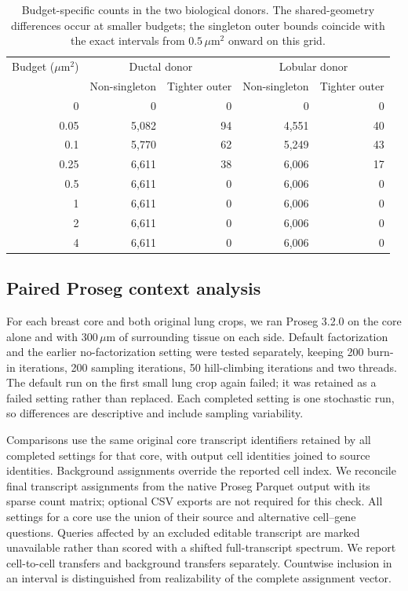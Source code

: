 \begin{table}[ht]\centering
\begin{tabular}{rrrrr}\toprule
Budget ($\mu\mathrm m^2$)&\multicolumn{2}{c}{Ductal donor}&\multicolumn{2}{c}{Lobular donor}\\
&Non-singleton&Tighter outer&Non-singleton&Tighter outer\\\midrule
0&0&0&0&0\\
0.05&5,082&94&4,551&40\\
0.1&5,770&62&5,249&43\\
0.25&6,611&38&6,006&17\\
0.5&6,611&0&6,006&0\\
1&6,611&0&6,006&0\\
2&6,611&0&6,006&0\\
4&6,611&0&6,006&0\\\bottomrule
\end{tabular}
\caption{Budget-specific counts in the two biological donors. The shared-geometry differences occur at smaller budgets; the singleton outer bounds coincide with the exact intervals from $0.5\,\mu\mathrm m^2$ onward on this grid.}
\end{table}

\FloatBarrier
\subsection{Paired Proseg context analysis}
For each breast core and both original lung crops, we ran Proseg 3.2.0 on the core alone and with $300\,\mu\mathrm m$ of surrounding tissue on each side. Default factorization and the earlier no-factorization setting were tested separately, keeping 200 burn-in iterations, 200 sampling iterations, 50 hill-climbing iterations and two threads. The default run on the first small lung crop again failed; it was retained as a failed setting rather than replaced. Each completed setting is one stochastic run, so differences are descriptive and include sampling variability.

Comparisons use the same original core transcript identifiers retained by all completed settings for that core, with output cell identities joined to source identities. Background assignments override the reported cell index. We reconcile final transcript assignments from the native Proseg Parquet output with its sparse count matrix; optional CSV exports are not required for this check. All settings for a core use the union of their source and alternative cell--gene questions. Queries affected by an excluded editable transcript are marked unavailable rather than scored with a shifted full-transcript spectrum. We report cell-to-cell transfers and background transfers separately. Countwise inclusion in an interval is distinguished from realizability of the complete assignment vector.


